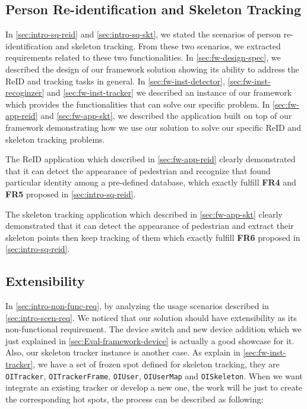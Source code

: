 \subsection{Person Re-identification and Skeleton Tracking}
\label{sec:Eval-framework-reid-skt}

In \autoref{sec:intro-sq-reid} and \autoref{sec:intro-sq-skt}, we stated the
scenarios of person re-identification and skeleton tracking. From these two
scenarios, we extracted requirements related to these two functionalities.
In \autoref{sec:fw-design-spec}, we described the design of our framework
solution showing its ability to address the ReID and tracking tasks in general.
In \autoref{sec:fw-inst-detector}, \autoref{sec:fw-inst-recoginzer} and
\autoref{sec:fw-inst-tracker} we described an instance of our framework which
provides the functionalities that can solve our specific problem. In
\autoref{sec:fw-app-reid} and \autoref{sec:fw-app-skt}, we described the
application built on top of our framework demonstrating how we use our solution
to solve our specific ReID and skeleton tracking problems.

The ReID application which described in \autoref{sec:fw-app-reid} clearly
demonstrated that it can detect the appearance of pedestrian and recognize that
found particular identity among a pre-defined database, which exactly fulfill
\textbf{FR4} and \textbf{FR5} proposed in \autoref{sec:intro-sq-reid}.

The skeleton tracking application which described in \autoref{sec:fw-app-skt}
clearly demonstrated that it can detect the appearance of pedestrian and
extract their skeleton points then keep tracking of them which exactly fulfill
\textbf{FR6} proposed in \autoref{sec:intro-sq-reid}.

\subsection{Extensibility}
\label{sec:Eval-framework-ext}

In \autoref{sec:intro-non-func-req}, by analyzing the usage scenarios described
in \autoref{sec:intro-scen-req}. We noticed that our solution should have
extensibility as its non-functional requirement.
The device switch and new device addition which we just explained in
\autoref{sec:Eval-framework-device} is actually a good showcase for it.
Also, our skeleton tracker instance is another case. As explain in
\autoref{sec:fw-inst-tracker}, we have a set of frozen spot defined for skeleton
tracking, they are \texttt{OITracker}, \texttt{OITrackerFrame},
\texttt{OIUser}, \texttt{OIUserMap} and \texttt{OISkeleton}. When we want
integrate an existing tracker or develop a new one, the work will be just to
create the corresponding hot spots, the process can be described as following:

